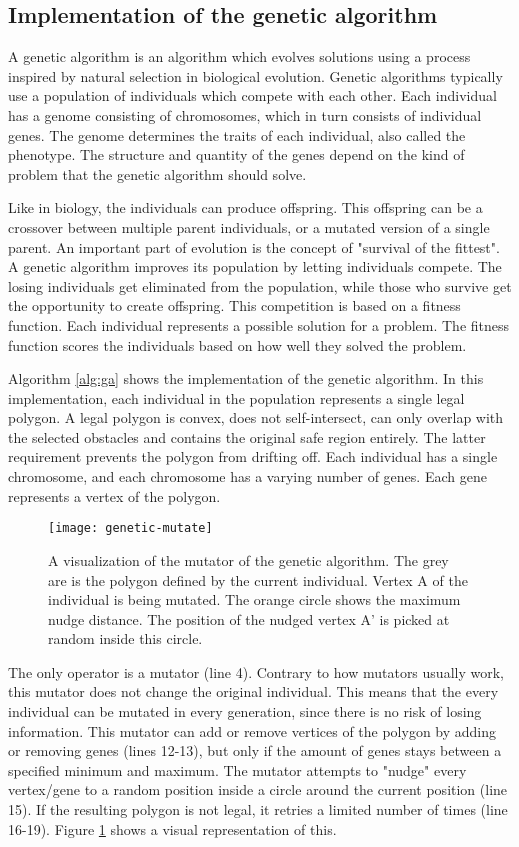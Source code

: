 \subsection{Implementation of the genetic algorithm}
A genetic algorithm is an algorithm which evolves solutions using a process inspired by natural selection in biological evolution. Genetic algorithms typically use a population of individuals which compete with each other. Each individual has a genome consisting of chromosomes, which in turn consists of individual genes. The genome determines the traits of each individual, also called the phenotype. The structure and quantity of the genes depend on the kind of problem that the genetic algorithm should solve. 
\par
Like in biology, the individuals can produce offspring. This offspring can be a crossover between multiple parent individuals, or a mutated version of a single parent. An important part of evolution is the concept of "survival of the fittest". A genetic algorithm improves its population by letting individuals compete. The losing individuals get eliminated from the population, while those who survive get the opportunity to create offspring. This competition is based on a fitness function. Each individual represents a possible solution for a problem. The fitness function scores the individuals based on how well they solved the problem.
\par
Algorithm \ref{alg:ga} shows the implementation of the genetic algorithm. In this implementation, each individual in the population represents a single legal polygon. A legal polygon is convex, does not self-intersect, can only overlap with the selected obstacles and contains the original safe region entirely. The latter requirement prevents the polygon from drifting off. Each individual has a single chromosome, and each chromosome has a varying number of genes. Each gene represents a vertex of the polygon.
\par
\begin{figure}[h]
\centering
\texttt{[image: genetic-mutate]}
\caption[A visualization of the mutator of the genetic algorithm]{A visualization of the mutator of the genetic algorithm. The grey are is the polygon defined by the current individual. Vertex A of the individual is being mutated. The orange circle shows the maximum nudge distance. The position of the nudged vertex A' is picked at random inside this circle.}
\label{fig:genetic-mutate}
\end{figure}
The only operator is a mutator (line 4). Contrary to how mutators usually work, this mutator does not change the original individual. This means that the every individual can be mutated in every generation, since there is no risk of losing information. This mutator can add or remove vertices of the polygon by adding or removing genes (lines 12-13), but only if the amount of genes stays between a specified minimum and maximum. The mutator attempts to "nudge" every vertex/gene to a random position inside a circle around the current position (line 15). If the resulting polygon is not legal, it retries a limited number of times (line 16-19). Figure \ref{fig:genetic-mutate} shows a visual representation of this.
